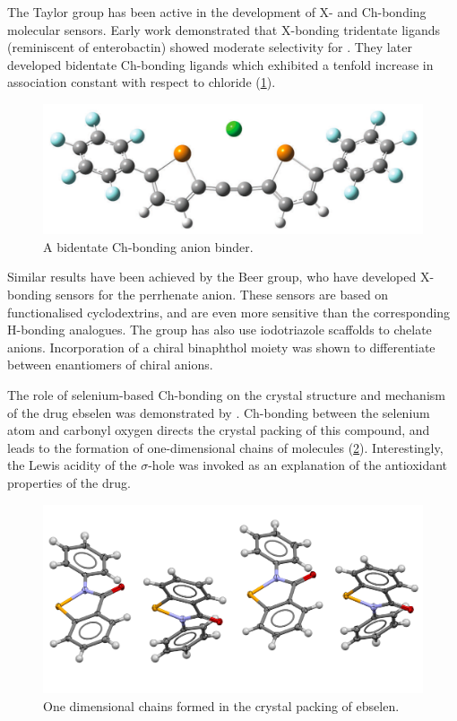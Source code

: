 \begin{refsection}
The Taylor group has been active in the development of X- and Ch-bonding molecular sensors.
Early work demonstrated that X-bonding tridentate ligands (reminiscent of enterobactin) showed moderate selectivity for .\autocite{Dimitrijevic2010}
They later developed bidentate Ch-bonding ligands which exhibited a tenfold increase in association constant with respect to chloride (\cref{fig:taylor-cl-binder}).\autocite{Garrett2015a,Garrett2016}

\begin{figure}
    \centering
    \includegraphics[width=0.6\linewidth]{Figures/taylor-cl-binder.pdf}
    \caption{A bidentate Ch-bonding anion binder.\autocite{Garrett2016}}\label{fig:taylor-cl-binder}
\end{figure}

Similar results have been achieved by the Beer group, who have developed X-bonding sensors for the perrhenate anion.\autocite{Cornes2017}
These sensors are based on functionalised cyclodextrins, and are even more sensitive than the corresponding H-bonding analogues.
The group has also use iodotriazole scaffolds to chelate anions.\autocite{Borissov2017}
Incorporation of a chiral binaphthol moiety was shown to differentiate between enantiomers of chiral anions.

The role of selenium-based Ch-bonding on the crystal structure and mechanism of the drug ebselen was demonstrated by \citeauthor{Thomas2015}.\autocite{Thomas2015}
Ch-bonding between the selenium atom and carbonyl oxygen directs the crystal packing of this compound, and leads to the formation of one-dimensional chains of molecules (\cref{fig:ebs-packing}).
Interestingly, the Lewis acidity of the $ \sigma $-hole was invoked as an explanation of the antioxidant properties of the drug.

\begin{figure}
    \centering
    \includegraphics[width=0.7\linewidth]{Figures/ebs-packing.pdf}
    \caption{One dimensional chains formed in the crystal packing of ebselen.}\label{fig:ebs-packing}
\end{figure}


\end{refsection}

